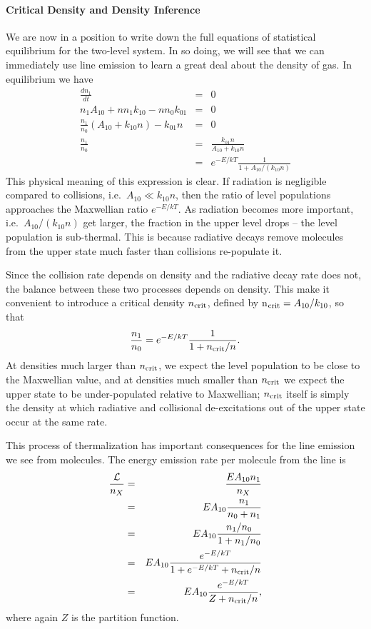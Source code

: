 \paragraph{Critical Density and Density Inference}

We are now in a position to write down the full equations of statistical equilibrium for the two-level system. In so doing, we will see that we can immediately use line emission to learn a great deal about the density of gas. In equilibrium we have
\begin{eqnarray}
\frac{dn_1}{dt} & = & 0 \\
n_1 A_{10} + n n_1 k_{10} -n n_0 k_{01} & = & 0 \\
\frac{n_1}{n_0} \left(A_{10} + k_{10}n\right) - k_{01} n & = & 0\\
\frac{n_1}{n_0} & = & \frac{k_{01} n}{A_{10}+k_{10} n}\\
& = & e^{-E/kT} \frac{1}{1+A_{10}/(k_{10} n)}
\end{eqnarray}
This physical meaning of this expression is clear. If radiation is negligible compared to collisions, i.e.\ $A_{10} \ll k_{10} n$, then the ratio of level populations approaches the Maxwellian ratio $e^{-E/kT}$. As radiation becomes more important, i.e.\ $A_{10}/(k_{10} n)$ get larger, the fraction in the upper level drops -- the level population is sub-thermal. This is because radiative decays remove molecules from the upper state much faster than collisions re-populate it.

Since the collision rate depends on density and the radiative decay rate does not, the balance between these two processes depends on density. This make it convenient to introduce a critical density $n_{\rm crit}$, defined by n$_{\rm crit} = A_{10} / k_{10}$, so that
\begin{equation}
\frac{n_1}{n_0} = e^{-E/kT} \frac{1}{1+n_{\rm crit}/n}.
\end{equation}
At densities much larger than $n_{\rm crit}$, we expect the level population to be close to the Maxwellian value, and at densities much smaller than $n_{\rm crit}$ we expect the upper state to be under-populated relative to Maxwellian; $n_{\rm crit}$ itself is simply the density at which radiative and collisional de-excitations out of the upper state occur at the same rate.

This process of thermalization has important consequences for the line emission we see from molecules. The energy emission rate per molecule from the line is 
\begin{eqnarray}
\frac{\mathcal{L}}{n_X} & = & \frac{E A_{10} n_1}{n_X} \\
& = & E A_{10} \frac{n_1}{n_0+n_1} \\
& = & E A_{10} \frac{n_1/n_0}{1+n_1/n_0} \\
& = & E A_{10} \frac{e^{-E/kT}}{1+e^{-E/kT}+n_{\rm crit}/n} \\
& = & E A_{10} \frac{e^{-E/kT}}{Z+n_{\rm crit}/n},
\end{eqnarray}
where again $Z$ is the partition function.

